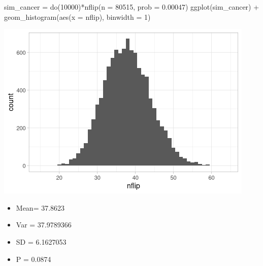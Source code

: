 \documentclass[
  10pt,
]{article}
\newenvironment{Shaded}{\begin{snugshade}}{\end{snugshade}}
\newcommand{\AttributeTok}[1]{\textcolor[rgb]{0.77,0.63,0.00}{#1}}
\newcommand{\DecValTok}[1]{\textcolor[rgb]{0.00,0.00,0.81}{#1}}
\newcommand{\FloatTok}[1]{\textcolor[rgb]{0.00,0.00,0.81}{#1}}
\newcommand{\FunctionTok}[1]{\textcolor[rgb]{0.00,0.00,0.00}{#1}}
\newcommand{\NormalTok}[1]{#1}
\newcommand{\OtherTok}[1]{\textcolor[rgb]{0.56,0.35,0.01}{#1}}
\newcommand{\SpecialCharTok}[1]{\textcolor[rgb]{0.00,0.00,0.00}{#1}}
\providecommand{\tightlist}{%
  \setlength{\itemsep}{0pt}\setlength{\parskip}{0pt}}
\begin{document}
\begin{Shaded}
\begin{Highlighting}[]
\NormalTok{sim\_cancer }\OtherTok{=} \FunctionTok{do}\NormalTok{(}\DecValTok{10000}\NormalTok{)}\SpecialCharTok{*}\FunctionTok{nflip}\NormalTok{(}\AttributeTok{n =} \DecValTok{80515}\NormalTok{, }\AttributeTok{prob =} \FloatTok{0.00047}\NormalTok{)}
\FunctionTok{ggplot}\NormalTok{(sim\_cancer) }\SpecialCharTok{+} 
  \FunctionTok{geom\_histogram}\NormalTok{(}\FunctionTok{aes}\NormalTok{(}\AttributeTok{x =}\NormalTok{ nflip), }\AttributeTok{binwidth =} \DecValTok{1}\NormalTok{)}
\end{Highlighting}
\end{Shaded}

\includegraphics{05.pvalues_files/figure-latex/unnamed-chunk-8-1.png}

\begin{itemize}
\tightlist
\item
  Mean= 37.8623
\item
  Var = 37.9789366
\item
  SD = 6.1627053
\item
  P = 0.0874
\end{itemize}

\newpage
\end{document}

